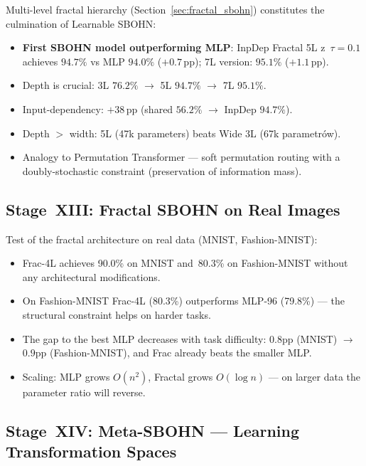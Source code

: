 \documentclass[11pt,a4paper]{report}
\begin{document}
Multi-level fractal hierarchy (Section~\ref{sec:fractal_sbohn}) constitutes the culmination of Learnable SBOHN:
\begin{itemize}
\item \textbf{First SBOHN model outperforming MLP}: InpDep Fractal 5L z~$\tau{=}0.1$ achieves $94.7\%$ vs MLP $94.0\%$ ($+0.7$\,pp); 7L version: $95.1\%$ ($+1.1$\,pp).
\item Depth is crucial: 3L $76.2\%$ $\to$ 5L $94.7\%$ $\to$ 7L $95.1\%$.
\item Input-dependency: $+38$\,pp (shared $56.2\%$ $\to$ InpDep $94.7\%$).
\item Depth $>$ width: 5L (47k parameters) beats Wide 3L (67k parametrów).
\item Analogy to Permutation Transformer --- soft permutation routing with a doubly-stochastic constraint (preservation of information mass).
\end{itemize}

\subsection{Stage~XIII: Fractal SBOHN on Real Images}

Test of the fractal architecture on real data (MNIST, Fashion-MNIST):
\begin{itemize}
\item Frac-4L achieves 90.0\% on MNIST and~80.3\% on Fashion-MNIST without any architectural modifications.
\item On Fashion-MNIST Frac-4L (80.3\%) outperforms MLP-96 (79.8\%) --- the structural constraint helps on harder tasks.
\item The gap to the best MLP decreases with task difficulty: $0.8$pp (MNIST) $\to$ $0.9$pp (Fashion-MNIST), and Frac already beats the smaller MLP.
\item Scaling: MLP grows $O(n^2)$, Fractal grows $O(\log n)$ --- on larger data the parameter ratio will reverse.
\end{itemize}

\subsection{Stage~XIV: Meta-SBOHN --- Learning Transformation Spaces}
\end{document}
